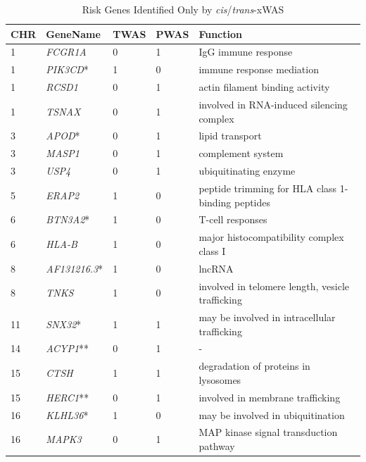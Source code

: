 \documentclass[11pt,hidelinks]{article}
\begin{document}
\begin{appendices}
\begin{table}[H]\centering
\caption{Risk Genes Identified Only by \textit{cis}/\textit{trans}-xWAS}
\begin{tabular}{lllll}
  \toprule
    CHR & GeneName & TWAS & PWAS & Function\\ 
    \midrule
    1 & \textit{FCGR1A} &   0 &   1 &   IgG immune response \\ 
    1 & \textit{PIK3CD}* &   1 &   0 &  immune response mediation   \\ 
    1 & \textit{RCSD1} &   0 &   1 &  actin filament binding activity  \\ 
    1 & \textit{TSNAX} &   0 &   1 &   involved in RNA-induced silencing complex \\ 
    3 & \textit{APOD}* &   0 &   1 &   lipid transport \\ 
    3 & \textit{MASP1} &   0 &   1 &  complement system  \\ 
    3 & \textit{USP4} &   0 &   1 &   ubiquitinating enzyme \\ 
    5 & \textit{ERAP2} &   1 &   0 &   peptide trimming for HLA class 1-binding peptides \\ 
    6 & \textit{BTN3A2}* &   1 &   0 &   T-cell responses  \\ 
    6 & \textit{HLA-B} &   1 &   0 &  major histocompatibility complex class I  \\ 
    8 & \textit{AF131216.3}* &   1 &   0 &  lncRNA  \\ 
    8 & \textit{TNKS} &   1 &   0 &   involved in telomere length, vesicle trafficking \\ 
   11 & \textit{SNX32}* &   1 &   1 &  may be involved in intracellular trafficking  \\ 
   14 & \textit{ACYP1}** &   0 &   1 &  -  \\ 
   15 & \textit{CTSH} &   1 &   1 &   degradation of proteins in lysosomes \\ 
   15 & \textit{HERC1}** &   0 &   1 &  involved in membrane trafficking  \\ 
   16 & \textit{KLHL36}* &   1 &   0 &  may be involved in ubiquitination  \\ 
   16 & \textit{MAPK3} &   0 &   1 & MAP kinase signal transduction pathway   \\ 

\end{tabular}
\end{table}
\end{appendices}
\end{document}
